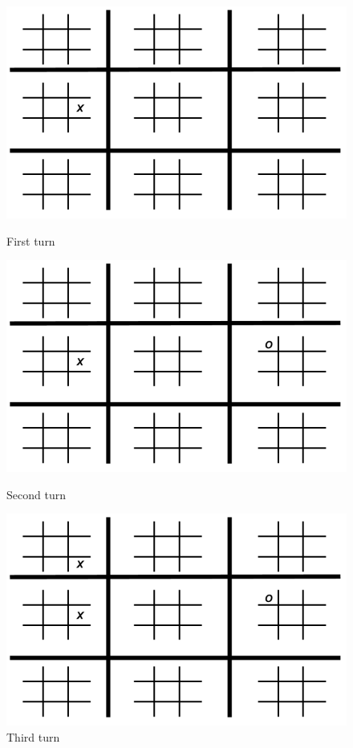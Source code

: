 \documentclass[10pt]{article}
\begin{document}
\begin{figure}[h]
\centering
\begin{minipage}{.33\textwidth}
  \centering
  \includegraphics[width=.9\linewidth]{img/ultimate1.png}
  \caption{First turn}
\end{minipage}%
\begin{minipage}{.33\textwidth}
  \centering
  \includegraphics[width=.9\linewidth]{img/ultimate2.png}
  \caption{Second turn}
\end{minipage}
\begin{minipage}{.33\textwidth}
  \centering
  \includegraphics[width=.9\linewidth]{img/ultimate3.png}
  \caption{Third turn}
\end{minipage}
\end{figure}
\end{document}
